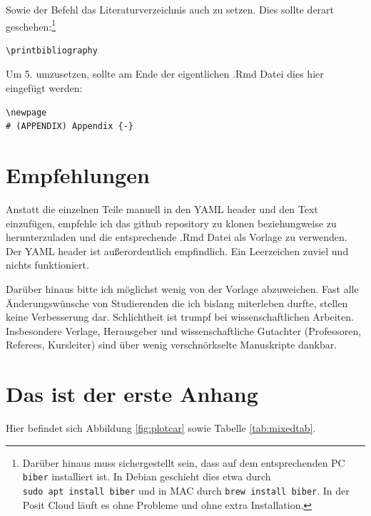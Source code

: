 \documentclass[
  doc,floatsintext]{apa6}
\begin{document}
Sowie der Befehl das Literaturverzeichnis auch zu setzen. Dies sollte derart geschehen:\footnote{Darüber hinaus muss sichergestellt sein, dass auf dem entsprechenden PC \texttt{biber} installiert ist. In Debian geschieht dies etwa durch \texttt{sudo\ apt\ install\ biber} und in MAC durch \texttt{brew\ install\ biber}. In der Posit Cloud läuft es ohne Probleme und ohne extra Installation.}

\begin{verbatim}
\printbibliography
\end{verbatim}

Um 5. umzusetzen, sollte am Ende der eigentlichen .Rmd Datei dies hier eingefügt werden:

\begin{verbatim}
\newpage
# (APPENDIX) Appendix {-} 
\end{verbatim}

\hypertarget{empfehlungen}{%
\section{Empfehlungen}\label{empfehlungen}}

Anstatt die einzelnen Teile manuell in den YAML header und den Text einzufügen, empfehle ich das github repository zu klonen beziehungweise zu herunterzuladen und die entsprechende .Rmd Datei als Vorlage zu verwenden. Der YAML header ist außerordentlich empfindlich. Ein Leerzeichen zuviel und nichts funktioniert.

Darüber hinaus bitte ich möglichst wenig von der Vorlage abzuweichen. Fast alle Änderungswünsche von Studierenden die ich bislang miterleben durfte, stellen keine Verbesserung dar. Schlichtheit ist trumpf bei wissenschaftlichen Arbeiten. Insbesondere Verlage, Herausgeber und wissenschaftliche Gutachter (Professoren, Referees, Kursleiter) sind über wenig verschnörkselte Manuskripte dankbar.

\printbibliography
\clearpage

\newpage

\hypertarget{appendix-appendix}{%
\appendix}


\hypertarget{das-ist-der-erste-anhang}{%
\section{Das ist der erste Anhang}\label{das-ist-der-erste-anhang}}

Hier befindet sich Abbildung \ref{fig:plotcar} sowie Tabelle \ref{tab:mixedtab}.
\end{document}
